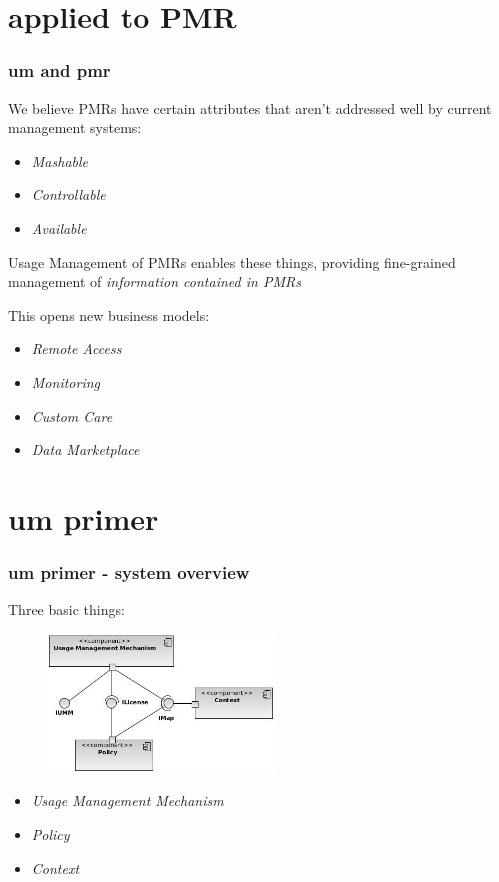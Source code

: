 \documentclass[t, 10pt]{beamer}
\begin{document}
\section{applied to PMR}
\begin{frame}
\frametitle{um and pmr}

We believe PMRs have certain attributes that aren't addressed well by current management systems:
\pause
\begin{itemize}
\item \textit{Mashable}
\pause
\item \textit{Controllable}
\pause
\item \textit{Available}
\end{itemize}
\pause

Usage Management of PMRs enables these things, providing fine-grained management of \textit{information contained in PMRs}
\newline
\newline
\pause

This opens new business models:
\pause
\begin{itemize}
\item \textit{Remote Access}
\pause
\item \textit{Monitoring}
\pause
\item \textit{Custom Care}
\pause
\item \textit{Data Marketplace}
\pause
\end{itemize}
 
\end{frame}

\section{um primer}
\begin{frame}
\frametitle{um primer - system overview}
\pause

Three basic things:
\begin{figure}
\includegraphics[width = 6cm]{Integrated}
\end{figure}

\begin{itemize}
\item \textit{Usage Management Mechanism}
\item \textit{Policy}
\item \textit{Context}
\end{itemize}
\pause

\end{frame}
\end{document}
